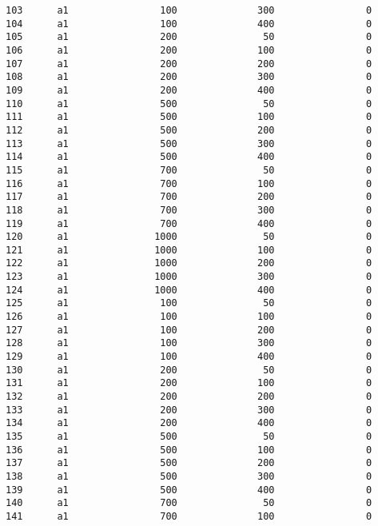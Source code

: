 \documentclass[11pt]{article}
\begin{document}
\begin{Verbatim}[commandchars=\\\{\}]
103      a1                100              300                0   
104      a1                100              400                0   
105      a1                200               50                0   
106      a1                200              100                0   
107      a1                200              200                0   
108      a1                200              300                0   
109      a1                200              400                0   
110      a1                500               50                0   
111      a1                500              100                0   
112      a1                500              200                0   
113      a1                500              300                0   
114      a1                500              400                0   
115      a1                700               50                0   
116      a1                700              100                0   
117      a1                700              200                0   
118      a1                700              300                0   
119      a1                700              400                0   
120      a1               1000               50                0   
121      a1               1000              100                0   
122      a1               1000              200                0   
123      a1               1000              300                0   
124      a1               1000              400                0   
125      a1                100               50                0   
126      a1                100              100                0   
127      a1                100              200                0   
128      a1                100              300                0   
129      a1                100              400                0   
130      a1                200               50                0   
131      a1                200              100                0   
132      a1                200              200                0   
133      a1                200              300                0   
134      a1                200              400                0   
135      a1                500               50                0   
136      a1                500              100                0   
137      a1                500              200                0   
138      a1                500              300                0   
139      a1                500              400                0   
140      a1                700               50                0   
141      a1                700              100                0   

\end{Verbatim}
\end{document}

